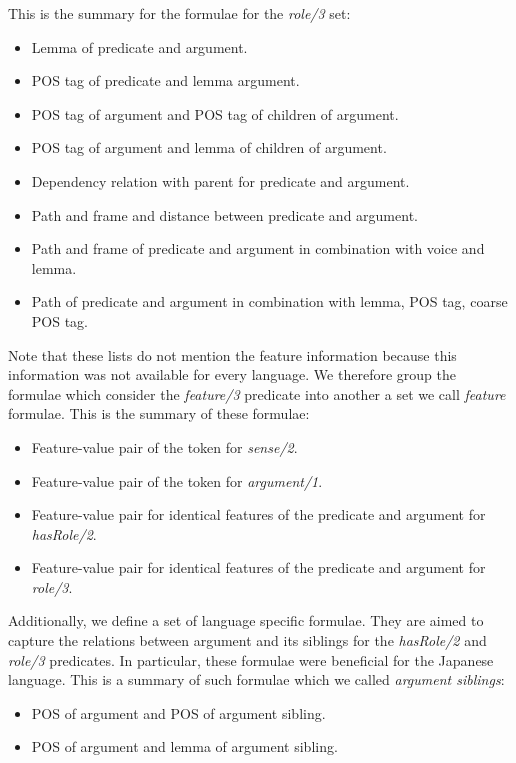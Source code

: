 This is the summary for the formulae for the \emph{role/3} set:
\begin{itemize}\addtolength{\itemsep}{-0.5\baselineskip}
    \item Lemma of predicate and argument.
    \item POS tag of predicate and lemma argument.
    \item POS tag of argument and POS tag of children of argument.
    \item POS tag of argument and lemma  of children of argument.
    \item Dependency relation with parent for predicate and argument.
    \item Path and frame and distance between predicate and argument.
    \item Path and frame of predicate and argument in combination with voice and 
        lemma.
    \item Path of predicate and argument in combination with lemma, POS tag, 
        coarse POS tag.
\end{itemize}

Note that these lists do not mention the feature information because 
this information was not available for every language. We therefore group the 
formulae which consider the \emph{feature/3} predicate into another a set we call 
\emph{feature} formulae. This is the summary of these formulae:
\begin{itemize}\addtolength{\itemsep}{-0.5\baselineskip}
    \item Feature-value pair of the token for \emph{sense/2}.
    \item Feature-value pair of the token for \emph{argument/1}.
    \item Feature-value pair for identical features of the predicate and argument 
        for \emph{hasRole/2}.
    \item Feature-value pair for identical features of the predicate and argument 
        for \emph{role/3}.
\end{itemize}

Additionally, we define a set of language specific formulae. They are aimed to 
capture the relations between argument and its siblings for the \emph{hasRole/2} 
and \emph{role/3} predicates.  In particular, these formulae were beneficial for 
the Japanese language.  This is a summary of such formulae which we called 
\emph{argument siblings}:
\begin{itemize}\addtolength{\itemsep}{-0.5\baselineskip}
    \item POS of argument and POS of argument sibling.
    \item POS of argument and lemma of argument sibling.
\end{itemize}

